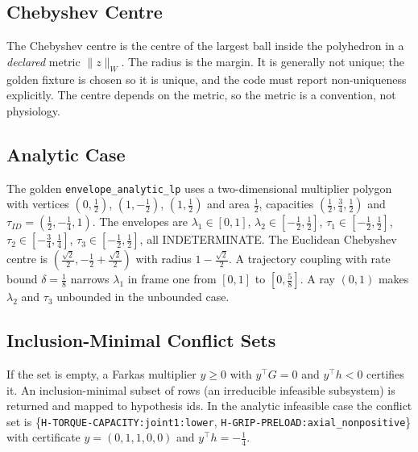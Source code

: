 \documentclass[11pt,a4paper]{article}
\begin{document}
\subsection{Chebyshev Centre}
The Chebyshev centre is the centre of the largest ball inside the polyhedron in
a \emph{declared} metric $\lVert z\rVert_W$.  The radius is the margin.  It is
generally not unique; the golden fixture is chosen so it is unique, and the
code must report non-uniqueness explicitly.  The centre depends on the metric,
so the metric is a convention, not physiology.

\subsection{Analytic Case}
The golden \texttt{envelope\_analytic\_lp} uses a two-dimensional multiplier
polygon with vertices $(0,\tfrac12)$, $(1,-\tfrac12)$, $(1,\tfrac12)$ and area
$\tfrac12$, capacities $(\tfrac12,\tfrac34,\tfrac12)$ and
$\tau_{ID}=(\tfrac12,-\tfrac14,1)$.  The envelopes are $\lambda_1\in[0,1]$,
$\lambda_2\in[-\tfrac12,\tfrac12]$, $\tau_1\in[-\tfrac12,\tfrac12]$,
$\tau_2\in[-\tfrac34,\tfrac14]$, $\tau_3\in[-\tfrac12,\tfrac12]$, all
INDETERMINATE.  The Euclidean Chebyshev centre is $(\tfrac{\sqrt2}{2},
-\tfrac12+\tfrac{\sqrt2}{2})$ with radius $1-\tfrac{\sqrt2}{2}$.  A trajectory
coupling with rate bound $\delta=\tfrac18$ narrows $\lambda_1$ in frame one from
$[0,1]$ to $[0,\tfrac58]$.  A ray $(0,1)$ makes $\lambda_2$ and $\tau_3$
unbounded in the unbounded case.

\subsection{Inclusion-Minimal Conflict Sets}
If the set is empty, a Farkas multiplier $y\ge0$ with $y^{\top}G=0$ and
$y^{\top}h<0$ certifies it.  An inclusion-minimal subset of rows (an
irreducible infeasible subsystem) is returned and mapped to hypothesis ids.  In
the analytic infeasible case the conflict set is
\{\texttt{H-TORQUE-CAPACITY:joint1:lower}, \texttt{H-GRIP-PRELOAD:axial\_nonpositive}\}
with certificate $y=(0,1,1,0,0)$ and $y^{\top}h=-\tfrac14$.
\end{document}
